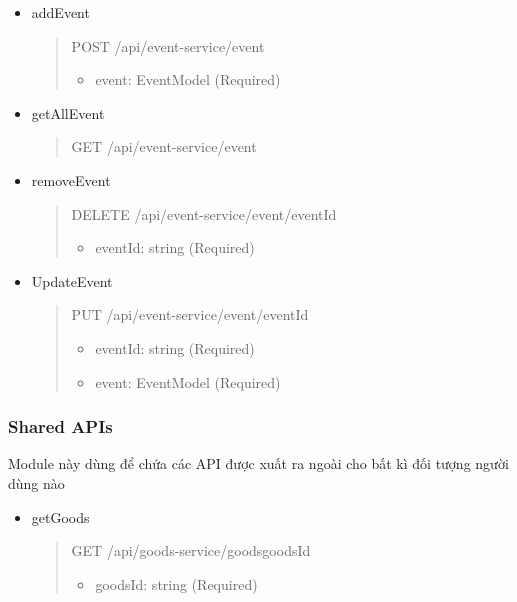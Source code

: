 \begin{itemize}
	\item addEvent
	\begin{quote}
		POST /api/event-service/event
		\begin{itemize}
			\item event: EventModel (Required)
		\end{itemize}
	\end{quote}

	\item getAllEvent
	\begin{quote}
		GET /api/event-service/event
	\end{quote}

	\item removeEvent
	\begin{quote}
		DELETE /api/event-service/event/{eventId}
		\begin{itemize}
			\item eventId: string (Required)
		\end{itemize}
	\end{quote}

	\item UpdateEvent
	\begin{quote}
		PUT /api/event-service/event/{eventId}
		\begin{itemize}
			\item eventId: string (Required)
			\item event: EventModel (Required)
		\end{itemize}
	\end{quote}
\end{itemize}




\subsubsection{Shared APIs}
Module này dùng để chứa các API được xuất ra ngoài cho bất kì đối tượng người dùng nào

\begin{itemize}
	\item getGoods
	\begin{quote}
		GET /api/goods-service/goods{goodsId}
		\begin{itemize}
			\item goodsId: string (Required)
		\end{itemize}
	\end{quote}
\end{itemize}

